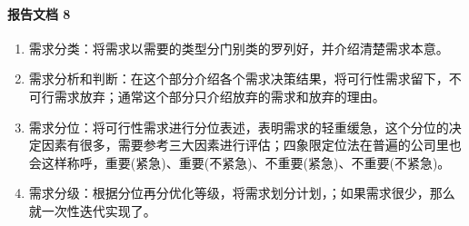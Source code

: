 \documentclass[letterpaper,10pt,english]{sphinxmanual}
\begin{document}
\paragraph{报告文档 8\sphinxfootnotemark[538]}
\label{\detokenize{chapter_knowledge/demand_analysis:id2}}%
\begin{footnotetext}[538]\sphinxAtStartFootnote
{}
%
\end{footnotetext}\ignorespaces \begin{enumerate}
%
\item {} 
需求分类：将需求以需要的类型分门别类的罗列好，并介绍清楚需求本意。

\item {} 
需求分析和判断：在这个部分介绍各个需求决策结果，将可行性需求留下，不可行需求放弃；通常这个部分只介绍放弃的需求和放弃的理由。

\item {} 
需求分位：将可行性需求进行分位表述，表明需求的轻重缓急，这个分位的决定因素有很多，需要参考三大因素进行评估；四象限定位法在普遍的公司里也会这样称呼，重要(紧急)、重要(不紧急)、不重要(紧急)、不重要(不紧急)。

\item {} 
需求分级：根据分位再分优化等级，将需求划分计划，；如果需求很少，那么就一次性迭代实现了。

\end{enumerate}
\end{document}
